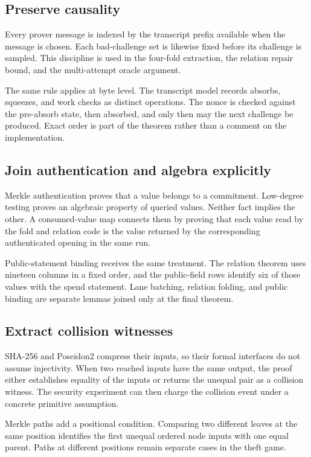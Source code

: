 \subsection{Preserve causality}

Every prover message is indexed by the transcript prefix available when the
message is chosen.  Each bad-challenge set is likewise fixed before its
challenge is sampled.  This discipline is used in the four-fold extraction,
the relation repair bound, and the multi-attempt oracle argument.

The same rule applies at byte level.  The transcript model records absorbs,
squeezes, and work checks as distinct operations.  The nonce is checked
against the pre-absorb state, then absorbed, and only then may the next
challenge be produced.  Exact order is part of the theorem rather than a
comment on the implementation.

\subsection{Join authentication and algebra explicitly}

Merkle authentication proves that a value belongs to a commitment.
Low-degree testing proves an algebraic property of queried values.  Neither
fact implies the other.  A consumed-value map connects them by proving that
each value read by the fold and relation code is the value returned by the
corresponding authenticated opening in the same run.

Public-statement binding receives the same treatment.  The relation theorem
uses nineteen columns in a fixed order, and the public-field rows identify six
of those values with the spend statement.  Lane batching, relation folding,
and public binding are separate lemmas joined only at the final theorem.

\subsection{Extract collision witnesses}

SHA-256 and Poseidon2 compress their inputs, so their formal interfaces do not
assume injectivity.  When two reached inputs have the same output, the proof
either establishes equality of the inputs or returns the unequal pair as a
collision witness.  The security experiment can then charge the collision
event under a concrete primitive assumption.

Merkle paths add a positional condition.  Comparing two different leaves at
the same position identifies the first unequal ordered node inputs with one
equal parent.  Paths at different positions remain separate cases in the
theft game.

